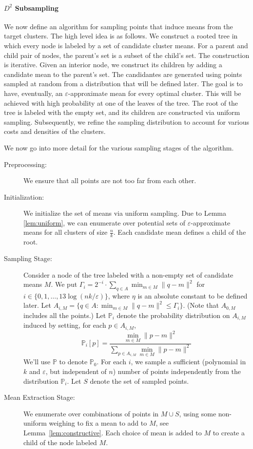 \documentclass[11pt]{article}
\begin{document}
\paragraph{$D^2$ Subsampling}
We now define an algorithm for sampling points that induce means from the target clusters.
The high level idea is as follows. We construct a rooted tree in which every node is labeled by a set of candidate cluster means. For a parent and child pair of nodes, the parent's set is a subset of the child's set. The construction is iterative. Given an interior node, we construct its children by adding a candidate mean to the parent's set. The candidantes are generated using points sampled at random from a distribution that will be defined later. The goal is to have, eventually, an $\varepsilon$-approximate mean for every optimal cluster. This will be achieved with high probability at one of the leaves of the tree. The root of the tree is labeled with the empty set, and its children are constructed via uniform sampling. Subsequently, we refine the sampling distribution to account for various costs and densities of the clusters.

We now go into more detail for the various sampling stages of the algorithm.

\begin{description}
    \item[Preprocessing:] We ensure that all points are not too far from each other.
    \item[Initialization:] We initialize the set of means via uniform sampling. Due to Lemma \ref{lem:uniform}, we can enumerate over potential sets of $\varepsilon$-approximate means for all clusters of size $\frac n k$. Each candidate mean defines a child of the root.
    \item[Sampling Stage:] Consider a node of the tree labeled with a non-empty set of candidate means $M$. We put 
    $\Gamma_i = 2^{-i}\cdot\sum_{q\in A}\min_{m\in M}\|q-m\|^2$ for $i\in \{0,1,\ldots,13\log ( nk / \varepsilon)\}$, where $\eta$ is an absolute constant to be defined later. Let $A_{i,M} = \{q\in A\colon \min_{m\in M}\|q-m\|^2\le \Gamma_i\}$. (Note that $A_{0,M}$ includes all the points.)
    Let $\mathbb{P}_i$ denote the probability distribution on $A_{i,M}$ induced by setting, for each $p\in A_{i,M}$, 
    $$
    \mathbb{P}_i[p]=\frac{\min_{m\in M}\|p-m\|^2}{\sum_{p\in A_{i,M}}\min_{m\in M}\|p-m\|^2}
    $$ 
    We'll use $\mathbb{P}$ to denote $\mathbb{P}_0$.
    For each $i$, we sample a sufficient (polynomial in $k$ and $\varepsilon$, but independent of $n$) number of points independently from the distribution $\mathbb{P}_i$. Let $S$ denote the set of sampled points.
    \item[Mean Extraction Stage:] We enumerate over combinations of points in $M\cup S$, using some non-uniform weighing to fix a mean to add to $M$, see Lemma~\ref{lem:constructive}. Each choice of mean is added to $M$ to create a child of the node labeled $M$.
\end{description}
\end{document}

